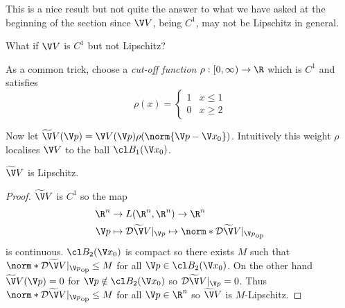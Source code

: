 \documentclass[a4paper]{article}
\newcommand*{\D}{\mathcal{D}}
\newcommand*{\nop}[1]{\norm*{#1}_{\text{op}}}
\theoremstyle{definition}
\begin{document}
This is a nice result but not quite the answer to what we have asked at the beginning of the section since \(\V V\), being \(C^1\), may not be Lipschitz in general.

\begin{question}
  What if \(\V V\) is \(C^1\) but not Lipschitz?
\end{question}

As a common trick, choose a \emph{cut-off function} \(\rho: [0, \infty) \to \R\) which is \(C^1\) and satisfies
\[
  \rho(x) =
  \begin{cases}
    1 & x \leq 1 \\
    0 & x \geq 2
  \end{cases}
\]

\begin{center}
\end{center}

Now let \(\widetilde \V V(\V p) = \V V(\V p)\rho(\norm{\V p - \V x_0})\). Intuitively this weight \(\rho\) localises \(\V V\) to the ball \(\cl B_1(\V x_0)\).

\begin{lemma}
  \(\widetilde \V V\) is Lipschitz.
\end{lemma}

\begin{proof}
  \(\widetilde \V V\) is \(C^1\) so the map
  \begin{align*}
    \R^n &\to L(\R^n, \R^n) \to \R^n \\
    \V p &\mapsto \D \widetilde \V V|_{\V p} \mapsto \nop{\D \widetilde \V V|_{\V p}}
  \end{align*}
  is continuous. \(\cl B_2(\V x_0)\) is compact so there exists \(M\) such that \(\nop{\D \widetilde \V V|_{\V p}} \leq M\) for all \(\V p \in \cl B_2(\V x_0)\). On the other hand \(\widetilde \V V(\V p) = 0\) for \(\V p \notin \cl B_2(\V x_0)\) so \(\D \widetilde \V V|_{\V p} = 0\). Thus \(\nop{\D \widetilde \V V|_{\V p}} \leq M\) for all \(\V p \in \R^n\) so \(\widetilde \V V\) is \(M\)-Lipschitz.
\end{proof}
\end{document}
